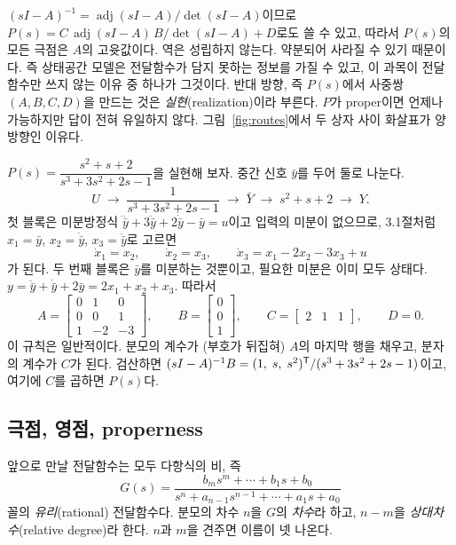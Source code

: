 \documentclass[11pt]{article}
\begin{document}
\begin{remark}
$(sI-A)^{-1} = \operatorname{adj}(sI-A)/\det(sI-A)$이므로
$P(s) = C\,\operatorname{adj}(sI-A)\,B/\det(sI-A) + D$로도 쓸 수 있고, 따라서
$P(s)$의 모든 극점은 $A$의 고윳값이다. 역은 성립하지 않는다. 약분되어 사라질 수
있기 때문이다. 즉 상태공간 모델은 전달함수가 담지 못하는 정보를 가질 수 있고,
이 과목이 전달함수만 쓰지 않는 이유 중 하나가 그것이다. 반대 방향, 즉 $P(s)$에서
사중쌍 $(A,B,C,D)$을 만드는 것은 \emph{실현}(realization)이라 부른다. $P$가
proper이면 언제나 가능하지만 답이 전혀 유일하지 않다. 그림~\ref{fig:routes}에서
두 상자 사이 화살표가 양방향인 이유다.
\end{remark}

\begin{example}[실현, 한 단계씩]\label{ex:realization}
$P(s)=\dfrac{s^{2}+s+2}{s^{3}+3s^{2}+2s-1}$을 실현해 보자. 중간 신호 $\bar y$를
두어 둘로 나눈다.
\[
   U \;\longrightarrow\; \boxed{\dfrac{1}{s^{3}+3s^{2}+2s-1}} \;\longrightarrow\;
   \bar Y \;\longrightarrow\; \boxed{s^{2}+s+2} \;\longrightarrow\; Y .
\]
첫 블록은 미분방정식 $\dddot{\bar y}+3\ddot{\bar y}+2\dot{\bar y}-\bar y=u$이고
입력의 미분이 없으므로, 3.1절처럼 $x_1=\bar y$, $x_2=\dot{\bar y}$,
$x_3=\ddot{\bar y}$로 고르면
\[
   \dot x_1=x_2,\qquad \dot x_2=x_3,\qquad \dot x_3 = x_1-2x_2-3x_3+u
\]
가 된다. 두 번째 블록은 $\bar y$를 미분하는 것뿐이고, 필요한 미분은 이미 모두
상태다. $y=\ddot{\bar y}+\dot{\bar y}+2\bar y = 2x_1+x_2+x_3$. 따라서
\[
   A=\begin{bmatrix}0&1&0\\0&0&1\\1&-2&-3\end{bmatrix},\qquad
   B=\begin{bmatrix}0\\0\\1\end{bmatrix},\qquad
   C=\begin{bmatrix}2&1&1\end{bmatrix},\qquad D=0 .
\]
이 규칙은 일반적이다. 분모의 계수가 (부호가 뒤집혀) $A$의 마지막 행을 채우고,
분자의 계수가 $C$가 된다. 검산하면
$(sI-A)^{-1}B=(1,\;s,\;s^{2})^{\mathsf{T}}/(s^{3}+3s^{2}+2s-1)$이고, 여기에 $C$를 곱하면
$P(s)$다.
\end{example}


\subsection{극점, 영점, properness}\label{sec:polezero}
앞으로 만날 전달함수는 모두 다항식의 비, 즉
\begin{equation}\label{eq:rational}
   G(s) = \frac{b_ms^{m}+\cdots+b_1s+b_0}
               {s^{n}+a_{n-1}s^{n-1}+\cdots+a_1s+a_0}
\end{equation}
꼴의 \emph{유리}(rational) 전달함수다. 분모의 차수 $n$을 $G$의 \emph{차수}라
하고, $n-m$을 \emph{상대차수}(relative degree)라 한다. $n$과 $m$을 견주면 이름이
넷 나온다.
\end{document}
